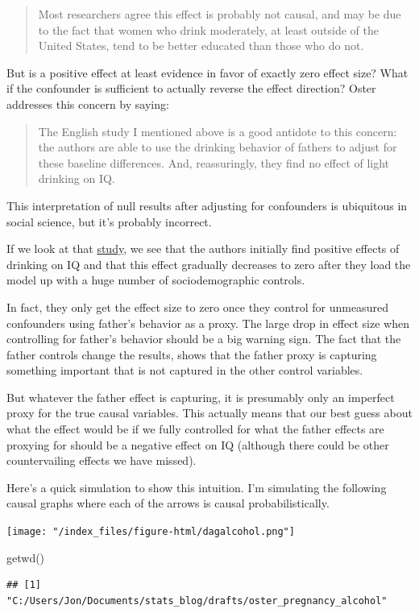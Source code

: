 \documentclass[
]{article}
\newenvironment{Shaded}{\begin{snugshade}}{\end{snugshade}}
\newcommand{\FunctionTok}[1]{\textcolor[rgb]{0.00,0.00,0.00}{#1}}
\newcommand{\NormalTok}[1]{#1}
\begin{document}
\begin{quote}
Most researchers agree this effect is probably not causal, and may be due to the fact that women who drink moderately, at least outside of the United States, tend to be better educated than those who do not.
\end{quote}

But is a positive effect at least evidence in favor of exactly zero effect size? What if the confounder is sufficient to actually reverse the effect direction? Oster addresses this concern by saying:

\begin{quote}
The English study I mentioned above is a good antidote to this concern: the authors are able to use the drinking behavior of fathers to adjust for these baseline differences. And, reassuringly, they find no effect of light drinking on IQ.
\end{quote}

This interpretation of null results after adjusting for confounders is ubiquitous in social science, but it's probably incorrect.

If we look at that \href{https://www.nature.com/articles/pr2008261/tables/4}{study}, we see that the authors initially find positive effects of drinking on IQ and that this effect gradually decreases to zero after they load the model up with a huge number of sociodemographic controls.

In fact, they only get the effect size to zero once they control for unmeasured confounders using father's behavior as a proxy. The large drop in effect size when controlling for father's behavior should be a big warning sign. The fact that the father controls change the results, shows that the father proxy is capturing something important that is not captured in the other control variables.

But whatever the father effect is capturing, it is presumably only an imperfect proxy for the true causal variables. This actually means that our best guess about what the effect would be if we fully controlled for what the father effects are proxying for should be a negative effect on IQ (although there could be other countervailing effects we have missed).

Here's a quick simulation to show this intuition. I'm simulating the following causal graphs where each of the arrows is causal probabilistically.

\texttt{[image: "/index\_files/figure-html/dagalcohol.png"]}

\begin{Shaded}
\begin{Highlighting}[]
\FunctionTok{getwd}\NormalTok{()}
\end{Highlighting}
\end{Shaded}

\begin{verbatim}
## [1] "C:/Users/Jon/Documents/stats_blog/drafts/oster_pregnancy_alcohol"
\end{verbatim}
\end{document}
